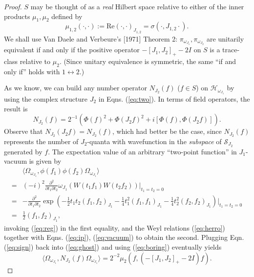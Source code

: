 \documentclass[12pt]{article}
\theoremstyle{remark}
\theoremstyle{definition}
\newcommand{\hil}[1]{\mathcal{#1}}
\begin{document}
 \begin{proof}  $S$ may be thought of as a \emph{real} Hilbert space 
 relative to either of the inner products $\mu_{1},\mu_{2}$ defined by
 \begin{equation} \label{eq:boring}
 \mu_{1,2}(\cdot,\cdot):=\mathrm{Re}(\cdot,\cdot)_{J_{1,2}}
 =\sigma(\cdot,J_{1,2}\cdot). 
 \end{equation}
 We shall use Van Daele and Verbeure's [1971] Theorem 2: 
 $\pi_{\omega_{J_{1}}},\pi_{\omega_{J_{2}}}$ are unitarily equivalent 
 if and only if the positive operator $-[J_{1},J_{2}]_{+}-2I$ on $S$ 
 is a trace-class 
 relative to $\mu_{2}$.  (Since unitary equivalence is symmetric, the 
 same ``if and only if'' holds with $1\leftrightarrow 2$.) 
 
 As we know, we can build any number operator $N_{J_{2}}(f)$ ($f\in S$) on 
 $\hil{H}_{\omega_{J_{1}}}$ by using the complex structure $J_{2}$ in 
 Eqns. (\ref{eq:two}).  In terms of field operators, the result is
 \begin{equation}  \label{eq:ghost}
 N_{J_{2}}(f)=2^{-1}(\Phi(f)^{2}+\Phi(J_{2}f)^{2}+i[\Phi(f),\Phi(J_{2}f)]).
 \end{equation}
 Observe that 
 $N_{J_{2}}(J_{2}f)=N_{J_{2}}(f)$, which had better be the case, since $N_{J_{2}}(f)$ 
 represents the number of $J_{2}$-quanta with wavefunction 
 in the \emph{subspace} of $\hil{S}_{J_{2}}$ generated by $f$.  The 
 expectation value of an arbitrary ``two-point function'' in $J_{1}$-vacuum 
 is given by
 \begin{eqnarray} \label{eq:watchout}
& \langle\Omega_{\omega_{J_{1}}},\phi (f_{1})\phi 
(f_{2})\Omega_{\omega_{J_{1}}}\rangle \\ = &
(-i)^{2}\frac{\partial
^{2}}{\partial t_{1}\partial t_{2}}\omega_{J_{1}}(W(t_{1}f_{1})W(t_{2}f_{2}))
|_{t_{1}=t_{2}=0} \\
=&-\frac{\partial ^{2}}{\partial t_{1}\partial 
t_{2}}\exp(-\frac{1}{2}t_{1}t_{2}(f_{1},f_{2})_{J_{1}}-\frac{1}{4}t_{1}^{2}
(f_{1},f_{1})_{J_{1}}-\frac{1}{4}t_{2}^{2} 
(f_{2},f_{2})_{J_{1}})|_{t_{1}=t_{2}=0} \\ \label{eq:sign}
=&\frac{1}{2}(f_{1},f_{2})_{J_{1}},
\end{eqnarray}
invoking (\ref{eq:reg}) in the first equality, and the Weyl 
relations (\ref{eq:herro}) together with Eqns. (\ref{eq:ip}), 
(\ref{eq:vacuum}) 
to obtain the second.   Plugging Eqn. (\ref{eq:sign}) back into 
(\ref{eq:ghost}) and using (\ref{eq:boring}) eventually yields 
\begin{equation} \label{eq:calculation}
\langle\Omega_{\omega_{J_{1}}},N_{J_{2}}(f)\Omega_{\omega_{J_{1}}}\rangle=   
2^{-2}\mu _{2}(f,(-[J_{1},J_{2}]_{+}-2I)f).
\end{equation}


\end{proof}
\end{document}
